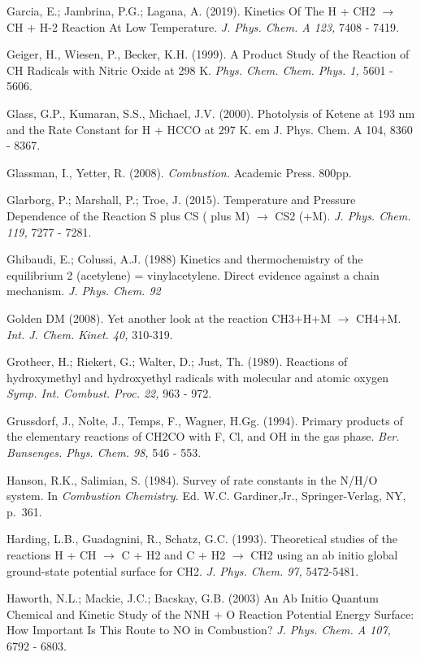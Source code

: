 \documentclass[12pt,landscape]{article}
\newcounter{reaction}
\begin{document}
Garcia, E.; Jambrina, P.G.; Lagana, A. (2019).
Kinetics Of The H + CH2 $\rightarrow$ CH + H-2 Reaction At Low Temperature.
{\em J. Phys. Chem. A  123,} 7408 - 7419.

Geiger, H., Wiesen, P., Becker, K.H. (1999).  A Product Study of the Reaction of CH Radicals with Nitric Oxide at 298 K.  {\em Phys. Chem. Chem. Phys. 1,} 5601 - 5606.

Glass, G.P., Kumaran, S.S., Michael, J.V. (2000).  Photolysis of Ketene at 193 nm and the Rate Constant for H + HCCO at 297 K.  {em J. Phys. Chem. A 104,} 8360 - 8367.

Glassman, I., Yetter, R.  (2008).  {\em Combustion.}  Academic Press. 800pp.

Glarborg, P.; Marshall, P.; Troe, J. (2015).
 Temperature and Pressure Dependence of the Reaction S plus CS ( plus M) $\rightarrow$ CS2 (+M).
{\em J. Phys. Chem. 119,} 7277 - 7281.

Ghibaudi, E.; Colussi, A.J.  (1988)
Kinetics and thermochemistry of the equilibrium 2 (acetylene) = vinylacetylene. Direct evidence against a chain mechanism.
{\em J. Phys. Chem. 92}

Golden DM (2008). Yet another look at the reaction CH3+H+M $\rightarrow$ CH4+M. {\em Int. J. Chem. Kinet. 40,} 310-319.

Grotheer, H.; Riekert, G.; Walter, D.; Just, Th. (1989).
Reactions of hydroxymethyl and hydroxyethyl radicals with molecular and atomic oxygen
{\em Symp. Int. Combust. Proc.  22,} 963 - 972.

Grussdorf, J., Nolte, J., Temps, F., Wagner, H.Gg. (1994).  Primary products of the elementary reactions of CH2CO with F, Cl, and OH in the gas phase.  {\em Ber. Bunsenges. Phys. Chem.  98,} 546 - 553.

Hanson, R.K., Salimian, S. (1984). Survey of rate constants in the N/H/O system. In {\em Combustion Chemistry.} Ed. W.C. Gardiner,Jr., Springer-Verlag, NY, p.\ 361.

Harding, L.B., Guadagnini, R., Schatz, G.C. (1993). Theoretical studies of the reactions H + CH $\rightarrow$ C + H2 and C + H2 $\rightarrow$ CH2 using an ab initio global ground-state potential surface for CH2. {\em J. Phys. Chem. 97,} 5472-5481.

Haworth, N.L.; Mackie, J.C.; Bacskay, G.B. (2003)  An Ab Initio Quantum Chemical and Kinetic Study of the NNH + O Reaction Potential Energy Surface: How Important Is This Route to NO in Combustion?   
{\em J. Phys. Chem. A  107,}  6792 - 6803.
\end{document}
